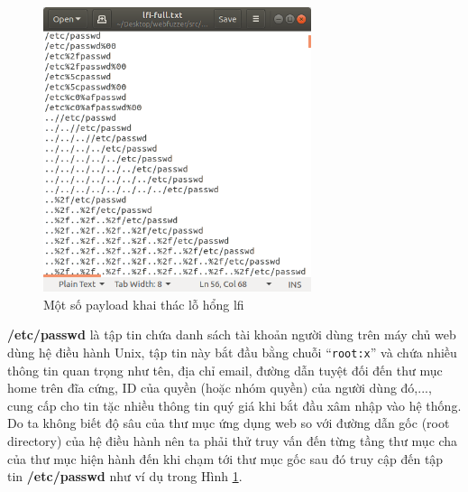 \begin{figure}[H]
  \centering
    \includegraphics[width=0.7\textwidth,keepaspectratio=true]{images/lfi-payloads.png}
  \caption{Một số payload khai thác lỗ hổng \acrshort{lfi}}
  \label{fig:lfi-payloads}
\end{figure}
\textbf{/etc/passwd} là tập tin chứa danh sách tài khoản người dùng trên máy chủ web dùng hệ điều hành Unix, tập tin này bắt đầu bằng chuỗi ``\texttt{root:x}'' và chứa nhiều thông tin quan trọng như tên, địa chỉ email, đường dẫn tuyệt đối đến thư mục home trên đĩa cứng, ID của quyền (hoặc nhóm quyền) của người dùng đó,..., cung cấp cho tin tặc nhiều thông tin quý giá khi bắt đầu xâm nhập vào hệ thống. Do ta không biết độ sâu của thư mục ứng dụng web so với đường dẫn gốc (root directory) của hệ điều hành nên ta phải thử truy vấn đến từng tầng thư mục cha của thư mục hiện hành đến khi chạm tới thư mục gốc sau đó truy cập đến tập tin \textbf{/etc/passwd} như ví dụ trong Hình \ref{fig:lfi-payloads}.
